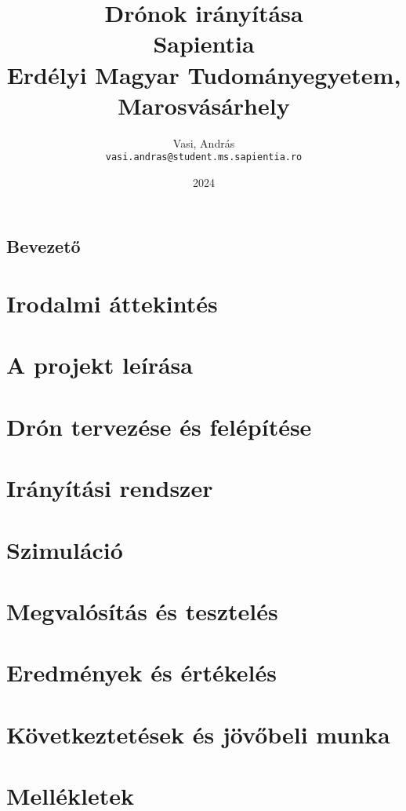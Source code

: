 \documentclass[12pt, twosides]{report}
\title{
	{Drónok irányítása}\\
	{\large Sapientia\\
	Erdélyi Magyar Tudományegyetem, Marosvásárhely}
}
\author{
	Vasi, András\\
	\texttt{vasi.andras@student.ms.sapientia.ro}
		
}
\date{2024}
\begin{document}
\section{Bevezető}


\tableofcontents

\listoffigures

\chapter{Irodalmi áttekintés}


\chapter{A projekt leírása}


\chapter{Drón tervezése és felépítése}


\chapter{Irányítási rendszer}


\chapter{Szimuláció}


\chapter{Megvalósítás és tesztelés}


\chapter{Eredmények és értékelés}


\chapter{Következtetések és jövőbeli munka}


\chapter{Mellékletek}





% 
\end{document}
